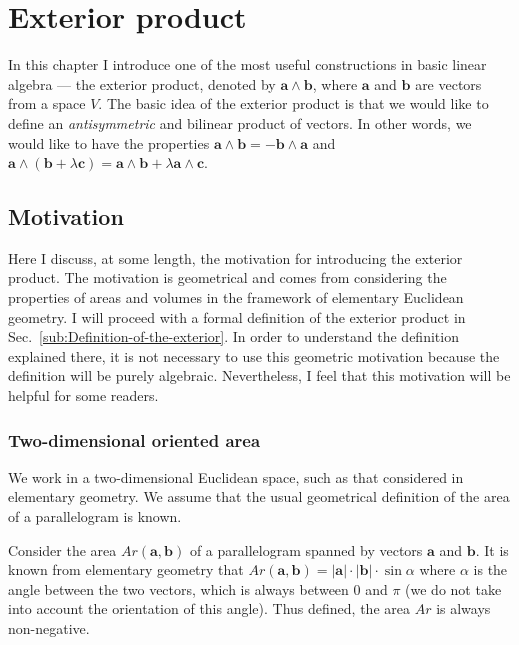 

\chapter{Exterior product \label{sec:Exterior-product}}

In this chapter I introduce one of the most useful constructions in
basic linear algebra --- the exterior product, denoted by $\mathbf{a}\wedge\mathbf{b}$,
where $\mathbf{a}$ and $\mathbf{b}$ are vectors from a space $V$.
The basic idea of the exterior product is that we would like to define
an \emph{antisymmetric} and bilinear product of vectors. In other
words, we would like to have the properties $\mathbf{a}\wedge\mathbf{b}=-\mathbf{b}\wedge\mathbf{a}$
and $\mathbf{a}\wedge(\mathbf{b}+\lambda\mathbf{c})=\mathbf{a}\wedge\mathbf{b}+\lambda\mathbf{a}\wedge\mathbf{c}$. 


\section{Motivation\label{sub:Motivation-for-exterior}}

Here I discuss, at some length, the motivation for introducing the
exterior product. The motivation is geometrical and comes from considering
the properties of areas and volumes in the framework of elementary
Euclidean geometry. I will proceed with a formal definition of the
exterior product in Sec.~\ref{sub:Definition-of-the-exterior}. In
order to understand the definition explained there, it is not necessary
to use this geometric motivation because the definition will be purely
algebraic. Nevertheless, I feel that this motivation will be helpful
for some readers.


\subsection{Two-dimen\-sion\-al oriented area\label{sub:Two-dimensional-oriented}}

We work in a two-dimen\-sion\-al Euclidean space, such as that considered
in elementary geometry. We assume that the usual geometrical definition
of the area of a parallelogram is known.

Consider the area $Ar(\mathbf{a},\mathbf{b})$ of a parallelogram
spanned by vectors $\mathbf{a}$ and $\mathbf{b}$. It is known from
elementary geometry that $Ar(\mathbf{a},\mathbf{b})=\left|\mathbf{a}\right|\cdot\left|\mathbf{b}\right|\cdot\sin\alpha$
where $\alpha$ is the angle between the two vectors, which is always
between 0 and $\pi$ (we do not take into account the orientation
of this angle). Thus defined, the area $Ar$ is always non-negative.

